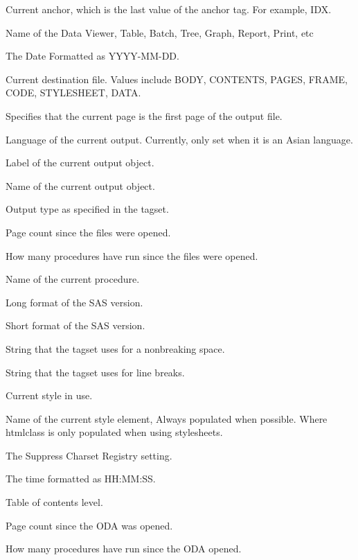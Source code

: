 \begin{description}

Current anchor, which is the last value of the anchor tag. For example, IDX.

Name of the Data Viewer, Table, Batch, Tree, Graph, Report, Print, etc

The Date Formatted as YYYY-MM-DD.

Current destination file. Values include BODY, CONTENTS, PAGES, FRAME, CODE, STYLESHEET, DATA.

Specifies that the current page is the first page of the output file.

Language of the current output. Currently, only set when it is an Asian language.

Label of the current output object.

Name of the current output object.

Output type as specified in the tagset.

Page count since the files were opened.

How many procedures have run since the files were opened.

Name of the current procedure.

Long format of the SAS version.

Short format of the SAS version.

String that the tagset uses for a nonbreaking space.

String that the tagset uses for line breaks.

Current style in use.

Name of the current style element, Always populated when possible. Where htmlclass is only populated when using stylesheets.

The Suppress Charset Registry setting.

The time formatted as HH:MM:SS.

Table of contents level.

Page count since the ODA was opened.

How many procedures have run since the ODA opened.

\end{description}

